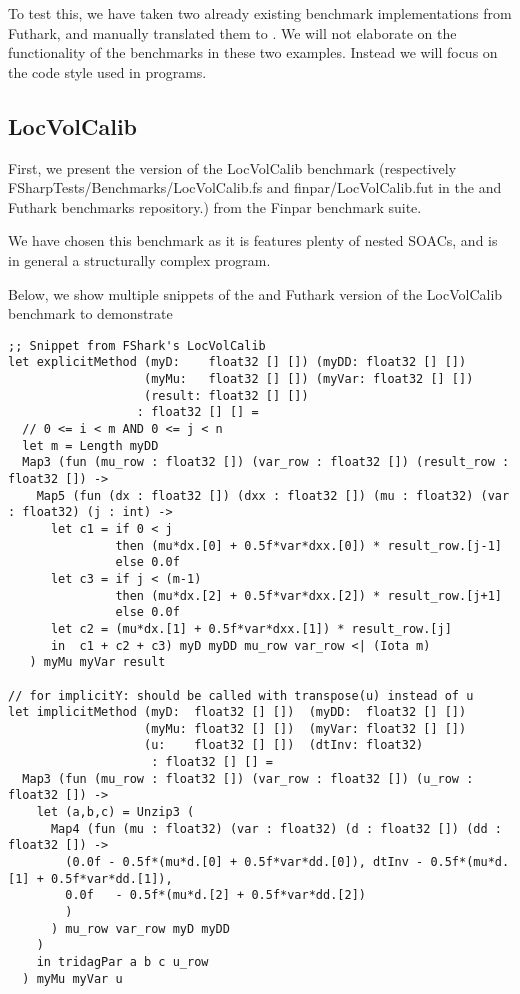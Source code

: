 To test this, we have taken two already existing benchmark implementations from
Futhark, and manually translated them to \fshark{}.
We will not elaborate on the functionality of the benchmarks in these two
examples. Instead we will focus on the code style used in \fshark{} programs.

\subsection{LocVolCalib}
\label{subsec:locvolcalib}
First, we present the \fshark{} version of the LocVolCalib benchmark (respectively
FSharpTests/Benchmarks/LocVolCalib.fs and finpar/LocVolCalib.fut in the
\fshark{} and Futhark benchmarks repository.) from the Finpar\cite{finpar}
benchmark suite.

We have chosen this benchmark as it is features plenty of nested SOACs, and is
in general a structurally complex program.

Below, we show multiple snippets of the \fshark{} and Futhark version of the
LocVolCalib benchmark to demonstrate
\begin{verbatim}
;; Snippet from FShark's LocVolCalib
let explicitMethod (myD:    float32 [] []) (myDD: float32 [] [])
                   (myMu:   float32 [] []) (myVar: float32 [] [])
                   (result: float32 [] [])
                  : float32 [] [] =
  // 0 <= i < m AND 0 <= j < n
  let m = Length myDD
  Map3 (fun (mu_row : float32 []) (var_row : float32 []) (result_row : float32 []) ->
    Map5 (fun (dx : float32 []) (dxx : float32 []) (mu : float32) (var : float32) (j : int) ->
      let c1 = if 0 < j
               then (mu*dx.[0] + 0.5f*var*dxx.[0]) * result_row.[j-1]
               else 0.0f
      let c3 = if j < (m-1)
               then (mu*dx.[2] + 0.5f*var*dxx.[2]) * result_row.[j+1]
               else 0.0f
      let c2 = (mu*dx.[1] + 0.5f*var*dxx.[1]) * result_row.[j]
      in  c1 + c2 + c3) myD myDD mu_row var_row <| (Iota m)
   ) myMu myVar result

// for implicitY: should be called with transpose(u) instead of u
let implicitMethod (myD:  float32 [] [])  (myDD:  float32 [] [])
                   (myMu: float32 [] [])  (myVar: float32 [] [])
                   (u:    float32 [] [])  (dtInv: float32)
                    : float32 [] [] =
  Map3 (fun (mu_row : float32 []) (var_row : float32 []) (u_row : float32 []) ->
    let (a,b,c) = Unzip3 (
      Map4 (fun (mu : float32) (var : float32) (d : float32 []) (dd : float32 []) ->
        (0.0f - 0.5f*(mu*d.[0] + 0.5f*var*dd.[0]), dtInv - 0.5f*(mu*d.[1] + 0.5f*var*dd.[1]), 
        0.0f   - 0.5f*(mu*d.[2] + 0.5f*var*dd.[2])
        )
      ) mu_row var_row myD myDD
    )
    in tridagPar a b c u_row
  ) myMu myVar u
\end{verbatim}

